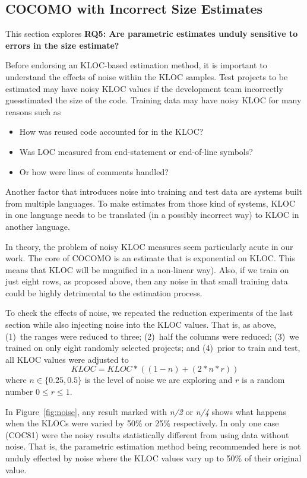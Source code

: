 \documentclass{sig-alternate}
\newcommand{\bi}{\begin{itemize}[leftmargin=0.4cm]}
\newcommand{\ei}{\end{itemize}}
\newcommand{\fig}[1]{Figure~\ref{fig:#1}}
\begin{document}
\subsection{COCOMO with Incorrect Size Estimates}\label{sect:nonoise}

This section explores
{\bf RQ5: Are parametric estimates unduly sensitive to
errors in the size estimate?}


Before endorsing an KLOC-based estimation method,
it is important to understand the effects of noise
within the KLOC samples. 
Test projects to be estimated may have noisy KLOC values if
the development team incorrectly guesstimated the size of
the code.
Training data may have noisy KLOC
for many reasons such as
\bi
\item How was reused code accounted
for in the KLOC?
\item  Was LOC measured from end-statement
or end-of-line symbols?
\item Or how were lines of comments handled?
\ei
Another factor that introduces noise into training and test
data are systems built from multiple languages. 
To make estimates from  those kind
of systems, KLOC in one language needs to be translated (in a possibly incorrect way) to KLOC in another language.

In theory, the  problem of noisy KLOC measures seem particularly acute in our work.
The core of COCOMO  is an estimate that is exponential on KLOC.
This means that 
 KLOC will be magnified in a non-linear way). 
Also, if we train on just eight rows, as proposed above,
then any noise in that small training data could be highly
detrimental to the estimation process.

To check the effects of noise, we repeated the reduction
experiments of the last section while also injecting
noise into the KLOC values.
That is, as above, 
(1)~the ranges were reduced to three;
(2)~half the columns were reduced;
(3)~we trained on only eight randomly selected projects; and 
(4)~prior to train and test, all KLOC values were adjusted
to
\[\mathit{KLOC} = \mathit{KLOC}*((1- n) + (2*n*r))\]
where $n \in \{0.25,0.5\}$ is the level of noise we are exploring and $r$ is a random number
$0 \le r \le 1$.

In \fig{noise}, any result
marked with {\em n/2} or {\em n/4} shows what happens
when the KLOCs were varied by 50\% or 25\% respectively.
In only one case (COC81) were the noisy results statistically
different from using data without noise. That is,
the parametric estimation method being recommended here is
not unduly effected by noise where the KLOC values
vary up to 50\% of their original value.
\end{document}
